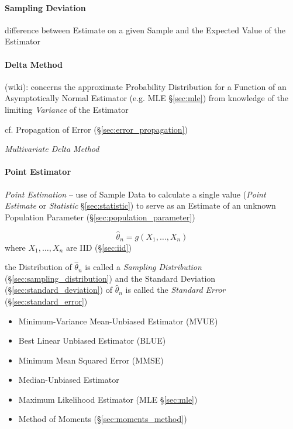 \paragraph{Sampling Deviation}\label{sec:sampling_deviation}\hfill

difference between Estimate on a given Sample and the Expected Value of the
Estimator



\paragraph{Delta Method}\label{sec:delta_method}\hfill

(wiki): concerns the approximate Probability Distribution for a Function of an
Asymptotically Normal Estimator (e.g. MLE \S\ref{sec:mle}) from knowledge of the
limiting \emph{Variance} of the Estimator

\fist cf. Propagation of Error (\S\ref{sec:error_propagation})

\emph{Multivariate Delta Method}



\paragraph{Point Estimator}\label{sec:point_estimator}\hfill

\emph{Point Estimation} -- use of Sample Data to calculate a single value
(\emph{Point Estimate} or \emph{Statistic} \S\ref{sec:statistic}) to serve as an
Estimate of an unknown Population Parameter (\S\ref{sec:population_parameter})

\[
  \hat{\theta}_n = g(X_1, \ldots, X_n)
\]
where $X_1, \ldots, X_n$ are IID (\S\ref{sec:iid})

the Distribution of $\hat{\theta}_n$ is called a \emph{Sampling Distribution}
(\S\ref{sec:sampling_distribution}) and the Standard Deviation
(\S\ref{sec:standard_deviation}) of $\hat{\theta}_n$ is called the
\emph{Standard Error} (\S\ref{sec:standard_error})

\begin{itemize}
  \item Minimum-Variance Mean-Unbiased Estimator (MVUE)
  \item Best Linear Unbiased Estimator (BLUE)
  \item Minimum Mean Squared Error (MMSE)
  \item Median-Unbiased Estimator
  \item Maximum Likelihood Estimator (MLE \S\ref{sec:mle})
  \item Method of Moments (\S\ref{sec:moments_method})
\end{itemize}

